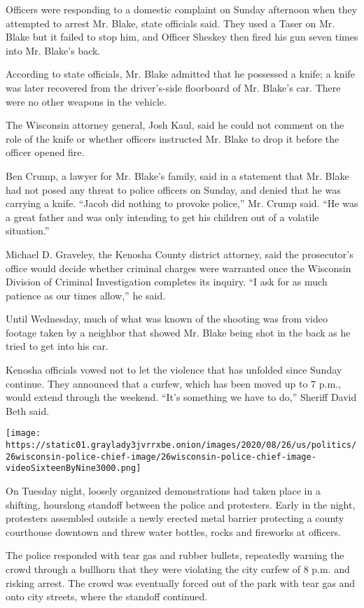 Officers were responding to a domestic complaint on Sunday afternoon
when they attempted to arrest Mr. Blake, state officials said. They used
a Taser on Mr. Blake but it failed to stop him, and Officer Sheskey then
fired his gun seven times into Mr. Blake's back.

According to state officials, Mr. Blake admitted that he possessed a
knife; a knife was later recovered from the driver's-side floorboard of
Mr. Blake's car. There were no other weapons in the vehicle.

The Wisconsin attorney general, Josh Kaul, said he could not comment on
the role of the knife or whether officers instructed Mr. Blake to drop
it before the officer opened fire.

Ben Crump, a lawyer for Mr. Blake's family, said in a statement that Mr.
Blake had not posed any threat to police officers on Sunday, and denied
that he was carrying a knife. ``Jacob did nothing to provoke police,''
Mr. Crump said. ``He was a great father and was only intending to get
his children out of a volatile situation.''

Michael D. Graveley, the Kenosha County district attorney, said the
prosecutor's office would decide whether criminal charges were warranted
once the Wisconsin Division of Criminal Investigation completes its
inquiry. ``I ask for as much patience as our times allow,'' he said.

Until Wednesday, much of what was known of the shooting was from video
footage taken by a neighbor that showed Mr. Blake being shot in the back
as he tried to get into his car.

Kenosha officials vowed not to let the violence that has unfolded since
Sunday continue. They announced that a curfew, which has been moved up
to 7 p.m., would extend through the weekend. ``It's something we have to
do,'' Sheriff David Beth said.

\texttt{[image: https://static01.graylady3jvrrxbe.onion/images/2020/08/26/us/politics/26wisconsin-police-chief-image/26wisconsin-police-chief-image-videoSixteenByNine3000.png]}

On Tuesday night, loosely organized demonstrations had taken place in a
shifting, hourslong standoff between the police and protesters. Early in
the night, protesters assembled outside a newly erected metal barrier
protecting a county courthouse downtown and threw water bottles, rocks
and fireworks at officers.

The police responded with tear gas and rubber bullets, repeatedly
warning the crowd through a bullhorn that they were violating the city
curfew of 8 p.m. and risking arrest. The crowd was eventually forced out
of the park with tear gas and onto city streets, where the standoff
continued.

